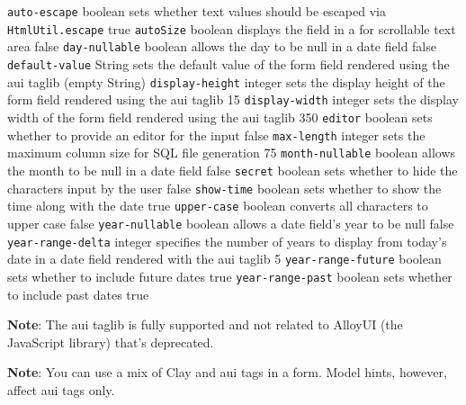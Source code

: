 \texttt{auto-escape} \textbar{} boolean \textbar{} sets whether text
values should be escaped via \texttt{HtmlUtil.escape} \textbar{} true
\textbar{} \texttt{autoSize} \textbar{} boolean \textbar{} displays the
field in a for scrollable text area \textbar{} false \textbar{}
\texttt{day-nullable} \textbar{} boolean \textbar{} allows the day to be
null in a date field \textbar{} false \textbar{} \texttt{default-value}
\textbar{} String \textbar{} sets the default value of the form field
rendered using the aui taglib \textbar{} (empty String) \textbar{}
\texttt{display-height} \textbar{} integer \textbar{} sets the display
height of the form field rendered using the aui taglib \textbar{} 15
\textbar{} \texttt{display-width} \textbar{} integer \textbar{} sets the
display width of the form field rendered using the aui taglib \textbar{}
350 \textbar{} \texttt{editor} \textbar{} boolean \textbar{} sets
whether to provide an editor for the input \textbar{} false \textbar{}
\texttt{max-length} \textbar{} integer \textbar{} sets the maximum
column size for SQL file generation \textbar{} 75 \textbar{}
\texttt{month-nullable} \textbar{} boolean \textbar{} allows the month
to be null in a date field \textbar{} false \textbar{} \texttt{secret}
\textbar{} boolean \textbar{} sets whether to hide the characters input
by the user \textbar{} false \textbar{} \texttt{show-time} \textbar{}
boolean \textbar{} sets whether to show the time along with the date
\textbar{} true \textbar{} \texttt{upper-case} \textbar{} boolean
\textbar{} converts all characters to upper case \textbar{} false
\textbar{} \texttt{year-nullable} \textbar{} boolean \textbar{} allows a
date field's year to be null \textbar{} false \textbar{}
\texttt{year-range-delta} \textbar{} integer \textbar{} specifies the
number of years to display from today's date in a date field rendered
with the aui taglib \textbar{} 5 \textbar{} \texttt{year-range-future}
\textbar{} boolean \textbar{} sets whether to include future dates
\textbar{} true \textbar{} \texttt{year-range-past} \textbar{} boolean
\textbar{} sets whether to include past dates \textbar{} true \textbar{}

\noindent\hrulefill

\noindent\hrulefill

\textbf{Note}: The aui taglib is fully supported and not related to
AlloyUI (the JavaScript library) that's deprecated.

\noindent\hrulefill

\noindent\hrulefill

\textbf{Note}: You can use a mix of Clay and aui tags in a form. Model
hints, however, affect aui tags only.

